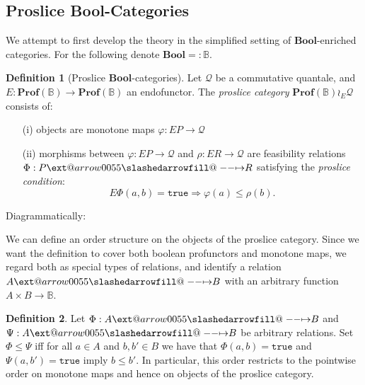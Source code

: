 \documentclass[12pt]{article}
\makeatletter
\theoremstyle{definition}
\newtheorem{definition}{Definition}[section]
\theoremstyle{plain}
\theoremstyle{plain}
\theoremstyle{plain}
\theoremstyle{plain}
\theoremstyle{remark}
\theoremstyle{remark}
\newcommand{\mc}[1]{\mathcal{#1}}
\def\slashedarrowfill@#1#2#3#4#5{%
	$\m@th\thickmuskip0mu\medmuskip\thickmuskip\thinmuskip\thickmuskip
	\relax#5#1\mkern-7mu%
	\cleaders\hbox{$#5\mkern-2mu#2\mkern-2mu$}\hfill
	\mathclap{#3}\mathclap{#2}%
	\cleaders\hbox{$#5\mkern-2mu#2\mkern-2mu$}\hfill
	\mkern-7mu#4$%
}
\def\rightslashedarrowfill@{%
	\slashedarrowfill@\relbar\relbar\mapstochar\rightarrow}
\newcommand\xslashedrightarrow[2][]{%
	\ext@arrow 0055{\rightslashedarrowfill@}{#1}{#2}}
\makeatother
\begin{document}
\subsection{Proslice \textbf{Bool}-Categories}

We attempt to first develop the theory in the simplified setting of $\mathbf{Bool}$-enriched categories. For the following denote $\mathbf{Bool} =: \mathbb{B}$.

\begin{definition}[Proslice \textbf{Bool}-categories]
	Let $\mc{Q}$ be a commutative quantale, and $E: \mathbf{Prof}(\mathbb{B}) \rightarrow \mathbf{Prof}(\mathbb{B})$ an endofunctor. The \emph{proslice category} $\mathbf{Prof}(\mathbb{B}) \wr_E \mc{Q}$ consists of:
	\begin{itemize}
		\item[(i)] objects are monotone maps $\varphi: EP \rightarrow \mc{Q}$ 
		\item[(ii)] morphisms between $\varphi: EP \rightarrow \mc{Q}$ and $\rho: ER \rightarrow \mc{Q}$ are feasibility relations $\Phi: P \xslashedrightarrow{} R$ satisfying the \emph{proslice condition}:
		\[E\Phi(a,b) = \mathtt{true} \Rightarrow \varphi(a) \leq \rho(b). \]
	\end{itemize}
	Diagrammatically:
	\begin{center}
	\end{center}
\end{definition}

We can define an order structure on the objects of the proslice category. Since we want the definition to cover both boolean profunctors and monotone maps, we regard both as special types of relations, and identify a relation $A \xslashedrightarrow{} B$ with an arbitrary function $A \times B \rightarrow \mathbb{B}$.

\begin{definition}
	Let $\Phi: A \xslashedrightarrow{} B$ and $\Psi: A \xslashedrightarrow{} B$ be arbitrary relations. Set $\Phi \leq \Psi$ iff for all $a \in A$ and $b,b' \in B$ we have that $\Phi(a,b) = \mathtt{true}$ and $\Psi(a,b') = \mathtt{true}$ imply $b \leq b'$. In particular, this order restricts to the pointwise order on monotone maps and hence on objects of the proslice category.
\end{definition}
\end{document}
